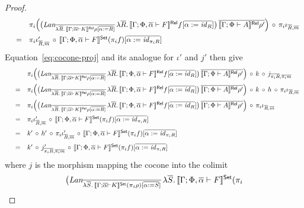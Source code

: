 \documentclass{lmcs}
\theoremstyle{plain}\newtheorem{satz}[thm]{Satz}
\renewcommand{\id}{\mathit{id}}
\begin{document}
\begin{proof}
\[\begin{array}{lll}
 & & \pi_i \Big( \big(\textit{Lan}_{\ol{\lambda \ol{R}.\,\relsem{\Gamma;
      \ol\alpha \vdash K}\rho[\ol{\alpha := R}]}}\, \lambda
\ol{R}.\,\relsem{\Gamma; \Phi, \ol\alpha \vdash F}f[\ol{\alpha :=
    \id_R}]\big)\, \ol{\relsem{\Gamma; \Phi \vdash A}\rho'} \Big)
\,\circ\, \pi_i \iota_{\ol{R}, \ol{m}} \\[2ex]
& = & \pi_i \iota'_{\ol{R},
  \ol{m}} \,\circ\, \setsem{\Gamma; \Phi, \ol\alpha \vdash F} (\pi_i
f)[\ol{\alpha := \id_{\pi_i R}}]
\end{array}\]
Equation~\ref{eq:cocone-proj} and its analogue for
  $\iota'$ and $j'$ then give 
\[\begin{array}{lll}
& & \pi_i \Big( \big(\textit{Lan}_{\ol{\lambda
    \ol{R}.\,\relsem{\Gamma; \ol\alpha \vdash K}\rho[\ol{\alpha :=
        R}]}}\, \lambda \ol{R}.\,\relsem{\Gamma; \Phi, \ol\alpha
  \vdash F}f[\ol{\alpha := \id_R}]\big)\, \ol{\relsem{\Gamma; \Phi
    \vdash A}\rho'} \Big) \,\circ \, k \,\circ\, j_{\ol{\pi_i R},
  \ol{\pi_i m}} \\[2ex]
&  = & \pi_i \Big( \big(\textit{Lan}_{\ol{\lambda \ol{R}.\,\relsem{\Gamma;
      \ol\alpha \vdash K}\rho[\ol{\alpha := R}]}}\, \lambda
\ol{R}.\,\relsem{\Gamma; \Phi, \ol\alpha \vdash F}f[\ol{\alpha :=
    \id_R}]\big)\, \ol{\relsem{\Gamma; \Phi \vdash A}\rho'} \Big)
\,\circ\, k \,\circ\, h \,\circ \,\pi_i \iota_{\ol{R}, \ol{m}} \\[2ex]
& = & \pi_i \Big( \big(\textit{Lan}_{\ol{\lambda \ol{R}.\,\relsem{\Gamma;
      \ol\alpha \vdash K}\rho[\ol{\alpha := R}]}}\, \lambda
\ol{R}.\,\relsem{\Gamma; \Phi, \ol\alpha \vdash F}f[\ol{\alpha :=
    \id_R}]\big)\, \ol{\relsem{\Gamma; \Phi \vdash A}\rho'} \Big)
\,\circ\, \pi_i \iota_{\ol{R}, \ol{m}} \\[2ex]
& = & \pi_i \iota'_{\ol{R},
  \ol{m}} \,\circ\, \setsem{\Gamma; \Phi, \ol\alpha \vdash F} (\pi_i
f)[\ol{\alpha := \id_{\pi_i R}}]\\[2ex]
& = & k' \, \circ \, h'\,\circ\,\pi_i \iota'_{\ol{R},
  \ol{m}} \,\circ\, \setsem{\Gamma; \Phi, \ol\alpha \vdash F} (\pi_i
f)[\ol{\alpha := \id_{\pi_i R}}]\\[2ex]
& = & k' \,\circ \, j'_{\ol{\pi_i R}, \ol{\pi_i m}} \,\circ\, \setsem{\Gamma; \Phi,
      \ol\alpha \vdash F} (\pi_i f)[\ol{\alpha := \id_{\pi_i R}}]
\end{array}\]
where $j$ is the morphism mapping the cocone into the colimit
\[
\big(\textit{Lan}_{\overline{\lambda \overline{S}.\,\llbracket{\Gamma; \overline{\alpha}
      \vdash K}\rrbracket^{\mathsf{Set}}(\pi_i \rho)[\overline{\alpha := S}]}}\, \lambda
\overline{S}.\,\llbracket{\Gamma; \Phi, \overline{\alpha} \vdash F}\rrbracket^{\mathsf{Set}}(\pi_i
\]
\end{proof}
\end{document}
